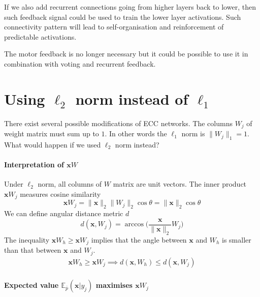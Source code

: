 \documentclass[12pt]{article}
\begin{document}
If we also add recurrent connections going from higher layers back to lower, then such feedback signal could be used to train the lower layer activations. Such connectivity pattern will lead to self-organisation and reinforcement of predictable activations.

The motor feedback is no longer necessary but it could be possible to use it in combination with voting and recurrent feedback.

\section{Using $\ell_2$ norm instead of $\ell_1$}

There exist several possible modifications of ECC networks. The columns $W_j$ of weight matrix must sum up to $1$. In other words the $\ell_1$ norm is $\lVert W_j \rVert_1=1$.
What would happen if we used $\ell_2$ norm instead?


\paragraph{Interpretation of $\boldsymbol{x}W$}
Under $\ell_2$ norm, all columns of $W$ matrix are unit vectors. The inner product $\boldsymbol{x}W_j$ measures cosine similarity 
\[
\boldsymbol{x}W_j = \lVert \boldsymbol{x} \rVert_2 \lVert W_j \rVert_2 \cos \theta = \lVert \boldsymbol{x} \rVert_2 \cos \theta 
\]
We can define angular distance metric $d$
\[
d(\boldsymbol{x},W_j )= \arccos\big(\frac{\boldsymbol{x}}{\lVert \boldsymbol{x} \rVert_2}W_j\big)
\]
The inequality $\boldsymbol{x}W_h \ge \boldsymbol{x}W_j$ implies that the angle between $\boldsymbol{x}$ and $W_h$ is smaller than that between $\boldsymbol{x}$ and $W_j$. 
\begin{gather*}
\boldsymbol{x}W_h \ge \boldsymbol{x}W_j \implies d(\boldsymbol{x},W_h) \le d(\boldsymbol{x},W_j)
\end{gather*}



\paragraph{Expected value $\mathbb{E}_{\bar{p}}(\boldsymbol{x}|y_j)$ maximises $\boldsymbol{x}W_j$} 
\end{document}
